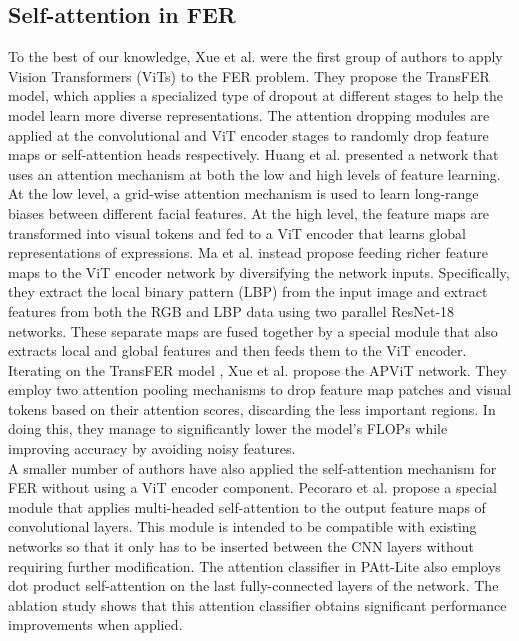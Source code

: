 \subsection{Self-attention in FER}

To the best of our knowledge, Xue et al. \cite{xue2021transfer} were the first group of authors to apply Vision Transformers (ViTs) to the FER problem.
They propose the TransFER model, which applies a specialized type of dropout at different stages to help the model learn more diverse representations.
The attention dropping modules are applied at the convolutional and ViT encoder stages to randomly drop feature maps or self-attention heads respectively.
Huang et al. \cite{huang2021} presented a network that uses an attention mechanism at both the low and high levels of feature learning.
At the low level, a grid-wise attention mechanism is used to learn long-range biases between different facial features.
At the high level, the feature maps are transformed into visual tokens and fed to a ViT encoder that learns global representations of expressions.
Ma et al. \cite{ma2023asf} instead propose feeding richer feature maps to the ViT encoder network by diversifying the network inputs.
Specifically, they extract the local binary pattern (LBP) from the input image and extract features from both the RGB and LBP data using two parallel ResNet-18 networks.
These separate maps are fused together by a special module that also extracts local and global features and then feeds them to the ViT encoder.
Iterating on the TransFER model \cite{apvit2023}, Xue et al. propose the APViT network.
They employ two attention pooling mechanisms to drop feature map patches and visual tokens based on their attention scores, discarding the less important regions.
In doing this, they manage to significantly lower the model's FLOPs while improving accuracy by avoiding noisy features.\\

A smaller number of authors have also applied the self-attention mechanism for FER without using a ViT encoder component.
Pecoraro et al. \cite{pecoraro2022lhc} propose a special module that applies multi-headed self-attention to the output feature maps of convolutional layers.
This module is intended to be compatible with existing networks so that it only has to be inserted between the CNN layers without requiring further modification.
The attention classifier in PAtt-Lite \cite{lengwe2023pattlite} also employs dot product self-attention on the last fully-connected layers of the network.
The ablation study shows that this attention classifier obtains significant performance improvements when applied.
